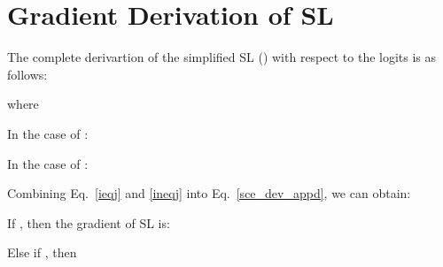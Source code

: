 \documentclass[10pt,twocolumn,letterpaper]{article}
\begin{document}
\section{Gradient Derivation of SL}\label{appendix_gradient}
The complete derivartion of the simplified SL () with respect to the logits is as follows:

where

In the case of :

In the case of :

Combining Eq.~\eqref{ieqj} and \eqref{ineqj} into Eq.~\eqref{sce_dev_appd}, we can obtain:

If , then the gradient of SL is:

Else if , then
\end{document}

